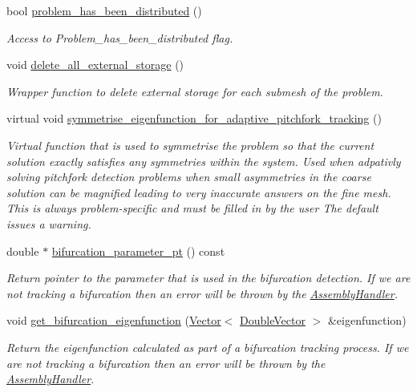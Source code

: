 \begin{DoxyCompactItemize}
bool \hyperlink{classoomph_1_1Problem_aa44439175e6899a1a6c125f08b786301}{problem\+\_\+has\+\_\+been\+\_\+distributed} ()
\begin{DoxyCompactList}\small\item\em Access to Problem\+\_\+has\+\_\+been\+\_\+distributed flag. \end{DoxyCompactList}\item 
void \hyperlink{classoomph_1_1Problem_ab8eb3782046c64ea0e46205917440452}{delete\+\_\+all\+\_\+external\+\_\+storage} ()
\begin{DoxyCompactList}\small\item\em Wrapper function to delete external storage for each submesh of the problem. \end{DoxyCompactList}\item 
virtual void \hyperlink{classoomph_1_1Problem_abbcf4965b6052758e49cf511947fd3f0}{symmetrise\+\_\+eigenfunction\+\_\+for\+\_\+adaptive\+\_\+pitchfork\+\_\+tracking} ()
\begin{DoxyCompactList}\small\item\em Virtual function that is used to symmetrise the problem so that the current solution exactly satisfies any symmetries within the system. Used when adpativly solving pitchfork detection problems when small asymmetries in the coarse solution can be magnified leading to very inaccurate answers on the fine mesh. This is always problem-\/specific and must be filled in by the user The default issues a warning. \end{DoxyCompactList}\item 
double $\ast$ \hyperlink{classoomph_1_1Problem_a3cf79b3067d1d794062ebb27e414dea9}{bifurcation\+\_\+parameter\+\_\+pt} () const
\begin{DoxyCompactList}\small\item\em Return pointer to the parameter that is used in the bifurcation detection. If we are not tracking a bifurcation then an error will be thrown by the \hyperlink{classoomph_1_1AssemblyHandler}{Assembly\+Handler}. \end{DoxyCompactList}\item 
void \hyperlink{classoomph_1_1Problem_a85b240c17750bdc32afafee35b50225a}{get\+\_\+bifurcation\+\_\+eigenfunction} (\hyperlink{classoomph_1_1Vector}{Vector}$<$ \hyperlink{classoomph_1_1DoubleVector}{Double\+Vector} $>$ \&eigenfunction)
\begin{DoxyCompactList}\small\item\em Return the eigenfunction calculated as part of a bifurcation tracking process. If we are not tracking a bifurcation then an error will be thrown by the \hyperlink{classoomph_1_1AssemblyHandler}{Assembly\+Handler}. \end{DoxyCompactList}\item 

\end{DoxyCompactItemize}
